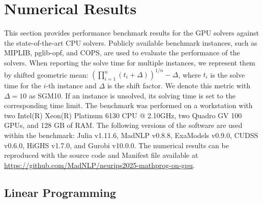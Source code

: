 \documentclass{article}
\begin{document}
\section{Numerical Results}\label{eqn:num}
This section provides performance benchmark results for the GPU solvers against the state-of-the-art CPU solvers.
Publicly available benchmark instances, such as MIPLIB, pglib-opf, and COPS, are used to evaluate the performance of the solvers.
When reporting the solve time for multiple instances, we represent them by shifted geometric mean: $\left(\prod_{i=1}^n (t_i + \Delta)\right)^{1/n} - \Delta$, where $t_i$ is the solve time for the $i$-th instance and $\Delta$ is the shift factor. We denote this metric with $\Delta = 10$ as SGM10. If an instance is unsolved, its solving time is set to the corresponding time limit.
The benchmark was performed on a workstation with two Intel(R) Xeon(R) Platinum 6130 CPU @ 2.10GHz, two Quadro GV 100 GPUs, and 128 GB of RAM.
The following versions of the software are used within the benchmark: Julia v1.11.6, MadNLP v0.8.8, ExaModels v0.9.0, CUDSS v0.6.0, HiGHS v1.7.0, and Gurobi v10.0.0.
The numerical results can be reproduced with the source code and Manifest file available at \url{https://github.com/MadNLP/neurips2025-mathprog-on-gpu}.



\subsection{Linear Programming}
\end{document}
